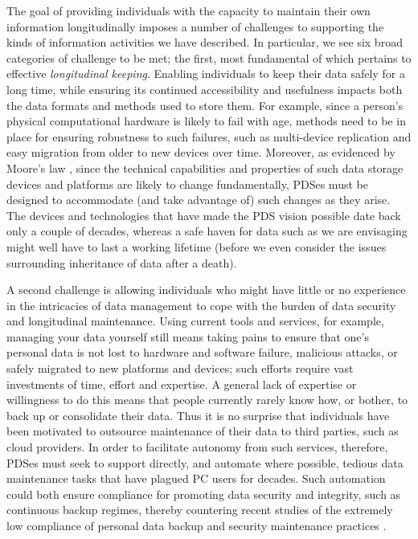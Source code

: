 \documentclass{acm_proc_article-sp}
\begin{document}
The goal of providing individuals with the capacity to maintain their own information longitudinally imposes a number of challenges to supporting the kinds of information activities we have described.  In particular, we see six broad categories of challenge to be met; the first, most fundamental of which pertains to effective \emph{longitudinal keeping}.  Enabling individuals to keep their data safely for a long time, while ensuring its continued accessibility and usefulness impacts both the data formats and methods used to store them.  For example, since a person's physical computational hardware is likely to fail with age, methods need to be in place for ensuring robustness to such failures, such as multi-device replication and easy migration from older to new devices over time.   Moreover, as evidenced by Moore's law \cite{schaller1997moore}, since the technical capabilities and properties of such data storage devices and platforms are likely to change fundamentally, PDSes must be designed to accommodate (and take advantage of) such changes as they arise. The devices and technologies that have made the PDS vision possible date back only a couple of decades, whereas a safe haven for data such as we are envisaging might well have to last a working lifetime (before we even consider the issues surrounding inheritance of data after a death).

A second challenge is allowing individuals who might have little or no experience in the intricacies of data management to cope with the burden of data security and longitudinal maintenance.  Using current tools and services, for example, managing your data yourself still means taking pains to ensure that one's personal data is not lost to hardware and software failure, malicious attacks, or safely migrated to new platforms and devices; such efforts require vast investments of time, effort and expertise.  A general lack of expertise or willingness to do this  means that people currently rarely know how, or bother, to back up or consolidate their data. Thus it is no surprise that individuals have been motivated to outsource maintenance of their data to third parties, such as cloud providers.  In order to facilitate autonomy from such services, therefore, PDSes must seek to support directly, and automate where possible, tedious data maintenance tasks that have plagued PC users for decades.  Such automation could both ensure compliance for promoting data security and integrity, such as continuous backup regimes, thereby countering recent studies of the extremely low compliance of personal data backup and security maintenance practices \cite{chervenak1998protecting, grasso2006survey}.
\end{document}
